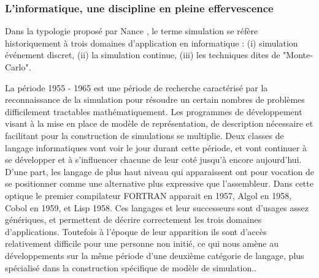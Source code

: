 {%


\subsubsection{L'informatique, une discipline en pleine effervescence}
\label{ssubsec:simulation_langage}


Dans la typologie proposé par Nance \autocite{Nance1993}, le terme simulation se réfère historiquement à trois domaines d'application en informatique : (i) simulation événement discret, (ii) la simulation continue, (iii) les techniques dites de "Monte-Carlo".

La période 1955 - 1965 est une période de recherche caractérisé par la reconnaissance de la simulation pour résoudre un certain nombres de problèmes difficilement tractables mathématiquement.\autocite{Nance1993, Ackoff1961} Les programmes de développement visant à la mise en place de modèle de représentation, de description nécessaire et facilitant pour la construction de simulations se multiplie. Deux classes de langage informatiques vont voir le jour durant cette période, et vont continuer à se développer et à s'influencer chacune de leur coté jusqu'à encore aujourd'hui. D'une part, les langage de plus haut niveau qui apparaissent ont pour vocation de se positionner comme une alternative plus expressive que l'assembleur. Dans cette optique le premier compilateur FORTRAN apparait en 1957,  Algol en 1958, Cobol en 1959, et Lisp 1958. Ces langages et leur successeurs sont d'usages assez génériques, et permettent de décrire correctement les trois domaines d'applications. Toutefois à l'époque de leur apparition ils sont d'accès relativement difficile pour une personne non initié, ce qui nous amène au développements sur la même période d'une deuxième catégorie de langage, plus spécialisé dans la construction spécifique de modèle de simulation.. \autocite[239]{Naylor1966}

}
